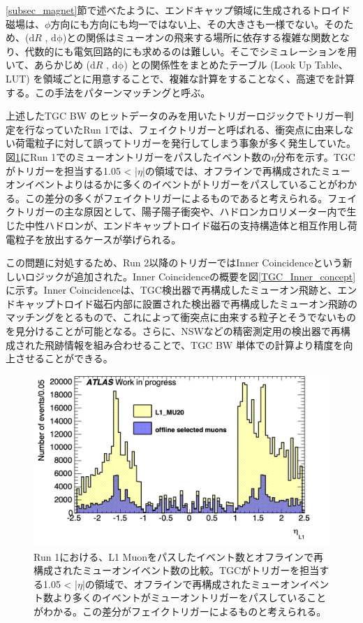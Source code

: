 \ref{subsec_magnet}節で述べたように、エンドキャップ領域に生成されるトロイド磁場は、$\phi$方向にも方向にも均一ではない上、その大きさも一様でない。そのため、($\mathrm{d}R$ , $\mathrm{d\phi}$)と\pt の関係はミューオンの飛来する場所に依存する複雑な関数となり、代数的にも電気回路的にも求めるのは難しい。そこでシミュレーションを用いて、あらかじめ  ($\mathrm{d}R$ , $\mathrm{d\phi}$) と\pt の関係性をまとめたテーブル  (Look Up Table、LUT) を領域ごとに用意することで、複雑な計算をすることなく、高速で\pt を計算する。この手法をパターンマッチングと呼ぶ。

上述したTGC BW のヒットデータのみを用いたトリガーロジックでトリガー判定を行なっていたRun 1では、フェイクトリガーと呼ばれる、衝突点に由来しない荷電粒子に対して誤ってトリガーを発行してしまう事象が多く発生していた。図\ref{TGC_faketrigger}にRun 1でのミューオントリガーをパスしたイベント数の$\eta$分布を示す。TGCがトリガーを担当する1.05 < |$\eta$|の領域では、オフラインで再構成されたミューオンイベントよりはるかに多くのイベントがトリガーをパスしていることがわかる。この差分の多くがフェイクトリガーによるものであると考えられる。フェイクトリガーの主な原因として、陽子陽子衝突や、ハドロンカロリメーター内で生じた中性ハドロンが、エンドキャップトロイド磁石の支持構造体と相互作用し荷電粒子を放出するケースが挙げられる。

この問題に対処するため、Run 2以降のトリガーではInner Coincidenceという新しいロジックが追加された。Inner Coincidenceの概要を図\ref{TGC_Inner_concept}に示す。Inner Coincidenceは、TGC検出器で再構成したミューオン飛跡と、エンドキャップトロイド磁石内部に設置された検出器で再構成したミューオン飛跡のマッチングをとるもので、これによって衝突点に由来する粒子とそうでないものを見分けることが可能となる。さらに、NSWなどの精密測定用の検出器で再構成された飛跡情報を組み合わせることで、TGC BW 単体での\pt 計算より精度を向上させることができる。


\begin{figure} 
\centering
\includegraphics[width=16cm]{fig/Intro/TGC_faketrigger.png}
\caption[Run-1での\pt 閾値]{Run 1における、L1 Muonをパスしたイベント数とオフラインで再構成されたミューオンイベント数の比較。TGCがトリガーを担当する1.05 < |$\eta$|の領域で、オフラインで再構成されたミューオンイベント数より多くのイベントがミューオントリガーをパスしていることがわかる。この差分がフェイクトリガーによるものと考えられる。}
\label{TGC_faketrigger}
\end{figure}

